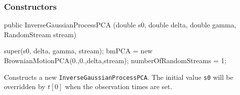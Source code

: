\subsubsection* {Constructors}
\begin{code}

   public InverseGaussianProcessPCA (double s0, double delta, double gamma,
                                     RandomStream stream) \begin{hide} {
        super(s0, delta, gamma, stream);
        bmPCA = new BrownianMotionPCA(0.,0.,delta,stream);
        numberOfRandomStreams = 1;
    }\end{hide}
\end{code}
\begin{tabb} Constructs a new \texttt{InverseGaussianProcessPCA}.
The initial value \texttt{s0} will be overridden by $t[0]$ when
the observation times are set.
\end{tabb}


